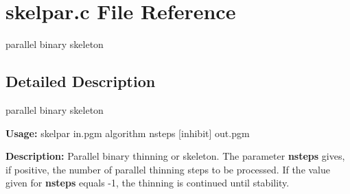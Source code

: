 \section{skelpar.c File Reference}
\label{skelpar_8c}
parallel binary skeleton  




\label{_details}
\subsection{Detailed Description}
parallel binary skeleton 

{\bf Usage:} skelpar in.pgm algorithm nsteps [inhibit] out.pgm

{\bf Description:} Parallel binary thinning or skeleton. The parameter {\bf nsteps} gives, if positive, the number of parallel thinning steps to be processed. If the value given for {\bf nsteps} equals -1, the thinning is continued until stability.


